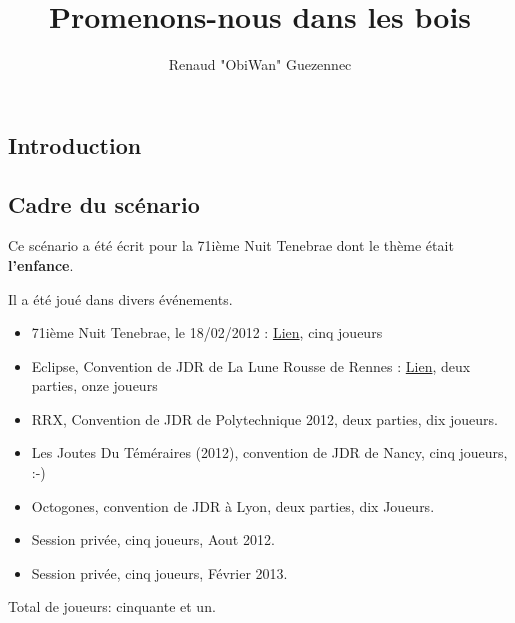 \documentclass[oneside,12pt]{book}
\title{Promenons-nous dans les bois}
\author{Renaud "ObiWan" Guezennec}
\date{}
\begin{document}
\maketitle \clearpage
\tableofcontents \clearpage
\listoffigures \clearpage

\begin{flushleft}
    \chapter{Introduction}
    \section{Cadre du scénario}
    Ce scénario a été écrit pour la 71ième Nuit Tenebrae dont le thème était \textbf{l'enfance}. 
    
    Il a été joué dans divers événements. 
    \begin{itemize}
    \item 71ième Nuit Tenebrae, le 18/02/2012 : \href{http://www.tenebrae-mundis.com/les-nuits-tenebrae/teaser-de-la-71e-nuit-tenebrae}{Lien}, cinq joueurs
    \item Eclipse, Convention de JDR de La Lune Rousse de Rennes : \href{http://www.ascreb.org/clubs/jdr/convention/archives/eclipse10.php}{Lien}, deux parties, onze joueurs
    \item RRX, Convention de JDR de Polytechnique 2012, deux parties, dix joueurs. 
    \item Les Joutes Du Téméraires (2012), convention de JDR de Nancy, cinq joueurs, :-)
    \item Octogones, convention de JDR à Lyon, deux parties, dix Joueurs.
    \item Session privée, cinq joueurs, Aout 2012.
    \item Session privée, cinq joueurs, Février 2013.
    \end{itemize}
    
    Total de joueurs: cinquante et un.


\end{flushleft}
\end{document}

